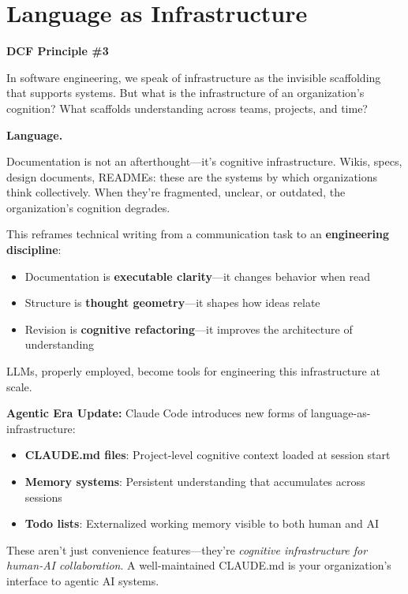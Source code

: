 \chapter{Language as Infrastructure}

\textbf{DCF Principle \#3}

In software engineering, we speak of infrastructure as the invisible scaffolding that supports systems. But what is the infrastructure of an organization's cognition? What scaffolds understanding across teams, projects, and time?

\textbf{Language.}

Documentation is not an afterthought---it's cognitive infrastructure. Wikis, specs, design documents, READMEs: these are the systems by which organizations think collectively. When they're fragmented, unclear, or outdated, the organization's cognition degrades.

This reframes technical writing from a communication task to an \textbf{engineering discipline}:

\begin{itemize}
    \item Documentation is \textbf{executable clarity}---it changes behavior when read
    \item Structure is \textbf{thought geometry}---it shapes how ideas relate
    \item Revision is \textbf{cognitive refactoring}---it improves the architecture of understanding
\end{itemize}

LLMs, properly employed, become tools for engineering this infrastructure at scale.

\begin{quotebox}
\textbf{Agentic Era Update:} Claude Code introduces new forms of language-as-infrastructure:
\begin{itemize}
    \item \textbf{CLAUDE.md files}: Project-level cognitive context loaded at session start
    \item \textbf{Memory systems}: Persistent understanding that accumulates across sessions
    \item \textbf{Todo lists}: Externalized working memory visible to both human and AI
\end{itemize}
These aren't just convenience features---they're \emph{cognitive infrastructure for human-AI collaboration}. A well-maintained CLAUDE.md is your organization's interface to agentic AI systems.
\end{quotebox}
